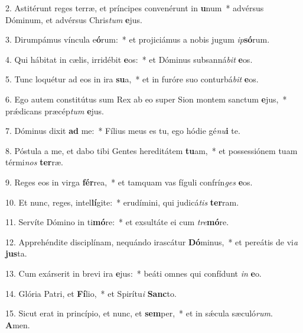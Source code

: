 2. Astitérunt reges terræ, et príncipes convenérunt in \textbf{u}num~*  advérsus Dóminum, et advérsus Chris\textit{tum} \textbf{e}jus.\

3. Dirumpámus víncula e\textbf{ó}rum:~*  et projiciámus a nobis jugum \textit{ip}\textbf{só}rum.\

4. Qui hábitat in cælis, irridébit \textbf{e}os:~*  et Dóminus subsanná\textit{bit} \textbf{e}os.\

5. Tunc loquétur ad eos in ira \textbf{su}a,~*  et in furóre suo conturbá\textit{bit} \textbf{e}os.\

6. Ego autem constitútus sum Rex ab eo super Sion montem sanctum \textbf{e}jus,~*  prǽdicans præcép\textit{tum} \textbf{e}jus.\

7. Dóminus dixit \textbf{ad} me:~*  Fílius meus es tu, ego hódie gé\textit{nu}\textbf{i} te.\

8. Póstula a me, et dabo tibi Gentes hereditátem \textbf{tu}am,~*  et possessiónem tuam térmi\textit{nos} \textbf{ter}ræ.\

9. Reges eos in virga \textbf{fér}rea,~*  et tamquam vas fíguli confrín\textit{ges} \textbf{e}os.\

10. Et nunc, reges, intel\textbf{lí}gite:~*  erudímini, qui judicá\textit{tis} \textbf{ter}ram.\

11. Servíte Dómino in ti\textbf{mó}re:~*  et exsultáte ei cum \textit{tre}\textbf{mó}re.\

12. Apprehéndite disciplínam, nequándo irascátur \textbf{Dó}minus,~*  et pereátis de vi\textit{a} \textbf{jus}ta.\

13. Cum exárserit in brevi ira \textbf{e}jus:~*  beáti omnes qui confídunt \textit{in} \textbf{e}o.\

14. Glória Patri, et \textbf{Fí}lio,~*  et Spirítu\textit{i} \textbf{Sanc}to.\

15. Sicut erat in princípio, et nunc, et \textbf{sem}per,~*  et in sǽcula sæculó\textit{rum}. \textbf{A}men.\

